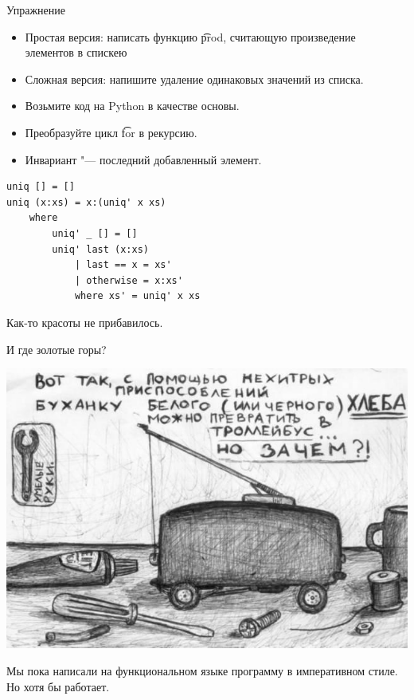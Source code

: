 \begin{frame}[t, fragile]{Упражнение}
	\begin{itemize}
		\item Простая версия: написать функцию \t{prod}, считающую произведение элементов в спискею
		\item Сложная версия: напишите удаление одинаковых значений из списка.
		\item Возьмите код на Python в качестве основы.
		\item Преобразуйте цикл \t{for} в рекурсию. \pause
		\item Инвариант "--- последний добавленный элемент.
	\end{itemize}
	\pause
\begin{verbatim}
uniq [] = []
uniq (x:xs) = x:(uniq' x xs)
    where
        uniq' _ [] = []
        uniq' last (x:xs)
            | last == x = xs'
            | otherwise = x:xs'
            where xs' = uniq' x xs
\end{verbatim}
	Как-то красоты не прибавилось.
\end{frame}

\begin{frame}{И где золотые горы?}
	\begin{center}
		\includegraphics[scale=0.35]{bread-why.jpg}
	\end{center}
	Мы пока написали на функциональном языке программу в императивном стиле.
	Но хотя бы работает.
\end{frame}

